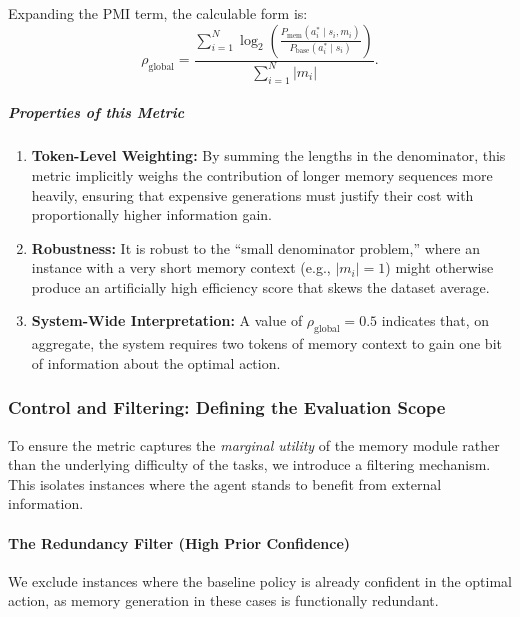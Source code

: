 Expanding the PMI term, the calculable form is:
\[
\rho_{\text{global}}
=
\frac{
    \sum_{i=1}^{N}
        \log_{2}
        \left(
            \frac{
                P_{\text{mem}}(a^*_i \mid s_i, m_i)
            }{
                P_{\text{base}}(a^*_i \mid s_i)
            }
        \right)
}{
    \sum_{i=1}^{N} |m_i|
}.
\]

\subparagraph{Properties of this Metric}

\begin{enumerate}
    \item \textbf{Token-Level Weighting:}  
    By summing the lengths in the denominator, this metric implicitly weighs the contribution of longer memory sequences more heavily, ensuring that expensive generations must justify their cost with proportionally higher information gain.

    \item \textbf{Robustness:}  
    It is robust to the ``small denominator problem,'' where an instance with a very short memory context (e.g., $|m_i| = 1$) might otherwise produce an artificially high efficiency score that skews the dataset average.

    \item \textbf{System-Wide Interpretation:}  
    A value of $\rho_{\text{global}} = 0.5$ indicates that, on aggregate, the system requires two tokens of memory context to gain one bit of information about the optimal action.
\end{enumerate}



\subsubsection{Control and Filtering: Defining the Evaluation Scope}

To ensure the metric captures the \emph{marginal utility} of the memory module rather than the underlying difficulty of the tasks, we introduce a filtering mechanism. This isolates instances where the agent stands to benefit from external information.

\paragraph{The Redundancy Filter (High Prior Confidence)}

We exclude instances where the baseline policy is already confident in the optimal action, as memory generation in these cases is functionally redundant.

